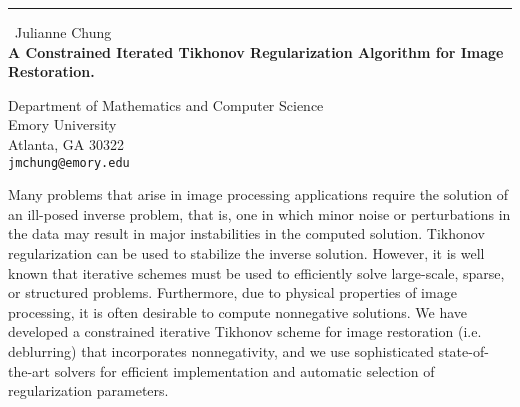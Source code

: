 \documentclass{report}
\begin{document}
\begin{center}
\rule{6in}{1pt} \
{\large Julianne Chung \\
{\bf A Constrained Iterated Tikhonov Regularization Algorithm for Image Restoration.}}

Department of Mathematics and Computer Science \\ Emory University \\
Atlanta, GA 30322 \\
{\tt jmchung@emory.edu}
\end{center}

Many problems that arise in image processing applications require
the solution of an ill-posed inverse problem, that is, one in which
minor noise or perturbations in the data may result in major
instabilities in the computed solution. Tikhonov regularization can
be used to stabilize the inverse solution. However, it is well known
that iterative schemes must be used to efficiently solve
large-scale, sparse, or structured problems. Furthermore, due to
physical properties of image processing, it is often desirable to
compute nonnegative solutions.  We have developed a
constrained iterative Tikhonov scheme for image restoration (i.e.
deblurring) that incorporates nonnegativity, and we use
sophisticated state-of-the-art solvers for efficient implementation
and automatic selection of regularization parameters.
\end{document}
